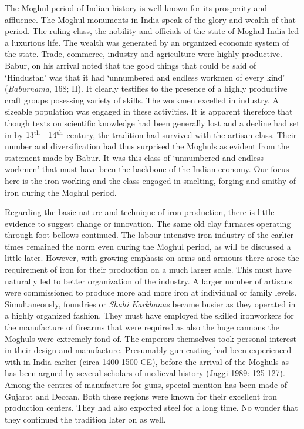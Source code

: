 The Moghul period of Indian history is well known for its prosperity and affluence. The Moghul monuments in India speak of the glory and wealth of that period. The ruling class, the nobility and officials of the state of Moghul India led a luxurious life. The wealth was generated by an organized economic system of the state. Trade, commerce, industry and agriculture were highly productive. Babur, on his arrival noted that the good things that could be said of `Hindustan' was that it had `unnumbered and endless workmen of every kind' ({\it Baburnama}, 168; II). It clearly testifies to the presence of a highly productive craft groups posessing variety of skills. The workmen excelled in industry. A sizeable population was engaged in these activities. It is apparent therefore that though texts on scientific knowledge had been generally lost and a decline had set in by $13^{\rm th}$ –$14^{\rm th}$ century, the tradition had survived with the artisan class. Their number and diversification had thus surprised the Moghuls as evident from the statement made by Babur. It was this class of `unnumbered and endless workmen' that must have been the backbone of the Indian economy. Our focus here is the iron working and the class engaged in smelting, forging and smithy of iron during the Moghul period.

Regarding the basic nature and technique of iron production, there is little evidence to suggest change or innovation. The same old clay furnaces operating through foot bellows continued. The labour intensive iron industry of the earlier times remained the norm even during the Moghul period, as will be discussed a little later. However, with growing emphasis on arms and armours there arose the requirement of iron for their production on a much larger scale. This must have naturally led to better organization of the industry. A larger number of artisans were commissioned to produce more and more iron at individual or family levels. Simultaneously, foundries or {\it Shahi Karkhanas} became busier as they operated in a highly organized fashion. They must have employed the skilled ironworkers for the manufacture of firearms that were required as also the huge cannons the Moghuls were extremely fond of. The emperors themselves took personal interest in their design and manufacture. Presumably gun casting had been experienced with in India earlier (circa 1400-1500 CE), before the arrival of the Moghuls as has been argued by several scholars of medieval history (Jaggi 1989: 125-127). Among the centres of manufacture for guns, special mention has been made of Gujarat and Deccan. Both these regions were known for their excellent iron production centers. They had also exported steel for a long time. No wonder that they continued the tradition later on as well.

